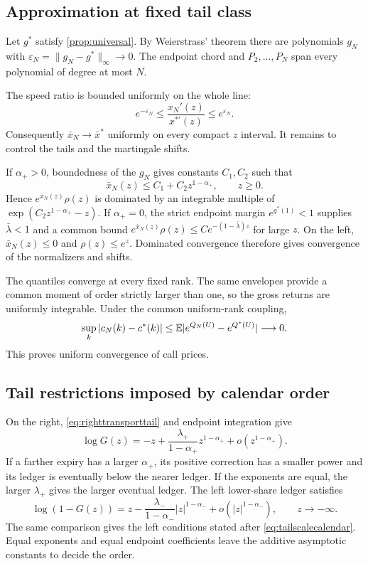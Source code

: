 \subsection{Approximation at fixed tail class}
\label{app:universalproof}

Let $g^*$ satisfy \cref{prop:universal}.  By Weierstrass' theorem there are
polynomials $g_N$ with
$\varepsilon_N=\lVert g_N-g^*\rVert_\infty\to0$.  The endpoint chord and
$P_2,\ldots,P_N$ span every polynomial of degree at most $N$.

The speed ratio is bounded uniformly on the whole line:
\[
e^{-\varepsilon_N}
\le\frac{x_N'(z)}{x^{*\prime}(z)}
\le e^{\varepsilon_N}.
\]
Consequently $\bar x_N\to\bar x^*$ uniformly on every compact $z$ interval.
It remains to control the tails and the martingale shifts.

If $\alpha_+>0$, boundedness of the $g_N$ gives constants $C_1,C_2$ such that
\[
\bar x_N(z)\le C_1+C_2z^{1-\alpha_+},\qquad z\ge0.
\]
Hence $e^{\bar x_N(z)}\rho(z)$ is dominated by an integrable multiple of
$\exp(C_2z^{1-\alpha_+}-z)$.  If $\alpha_+=0$, the strict endpoint margin
$e^{g^*(1)}<1$ supplies $\bar\lambda<1$ and a common bound
$e^{\bar x_N(z)}\rho(z)\le C e^{-(1-\bar\lambda)z}$ for large $z$.
On the left, $\bar x_N(z)\le0$ and $\rho(z)\le e^z$.  Dominated convergence
therefore gives convergence of the normalizers and shifts.

The quantiles converge at every fixed rank.  The same envelopes provide a
common moment of order strictly larger than one, so the gross returns are
uniformly integrable.  Under the common uniform-rank coupling,
\[
\sup_k|c_N(k)-c^*(k)|
\le\mathbb{E}|e^{Q_N(U)}-e^{Q^*(U)}|\longrightarrow0.
\]
This proves uniform convergence of call prices.

\subsection{Tail restrictions imposed by calendar order}
\label{app:calendartails}

On the right, \eqref{eq:righttransporttail} and endpoint integration give
\[
\log G(z)=-z+
\frac{\lambda_+}{1-\alpha_+}z^{1-\alpha_+}+o(z^{1-\alpha_+}).
\]
If a farther expiry has a larger $\alpha_+$, its positive correction has a
smaller power and its ledger is eventually below the nearer ledger.  If the
exponents are equal, the larger $\lambda_+$ gives the larger eventual ledger.
The left lower-share ledger satisfies
\[
\log(1-G(z))=z-
\frac{\lambda_-}{1-\alpha_-}|z|^{1-\alpha_-}
+o(|z|^{1-\alpha_-}),
\qquad z\to-\infty.
\]
The same comparison gives the left conditions stated after
\eqref{eq:tailscalecalendar}.  Equal exponents and equal endpoint coefficients
leave the additive asymptotic constants to decide the order.
